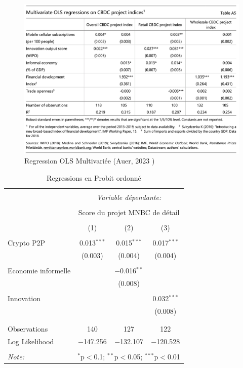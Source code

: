 \documentclass[12pt]{article}
\begin{document}
\begin{figure}
    \centering
    \includegraphics[width=1\linewidth]{TAB AUER OLS Multivariate.png}
    \caption{Regression OLS Multivariée (Auer, 2023 \cite{RePEc:bis:biswps:880})}
    \label{fig:Regression_OLS_Multivariée}
\end{figure}

\begin{table}[!htbp] \centering 
  \caption{Regressions en Probit ordonné} 
  \label{} 
\begin{tabular}{@{\extracolsep{5pt}}lccc} 
\\[-1.8ex]\hline 
\hline \\[-1.8ex] 
 & \multicolumn{3}{c}{\textit{Variable dépendante:}} \\ 
\cline{2-4} 
\\[-1.8ex] & \multicolumn{3}{c}{Score du projet MNBC de détail} \\ 
\\[-1.8ex] & (1) & (2) & (3)\\ 
\hline \\[-1.8ex] 
 Crypto P2P & 0.013$^{***}$ & 0.015$^{***}$ & 0.017$^{***}$ \\ 
  & (0.003) & (0.004) & (0.004) \\ 
  & & & \\ 
 Economie informelle &  & $-$0.016$^{**}$ &  \\ 
  &  & (0.008) &  \\ 
  & & & \\ 
 Innovation &  &  & 0.032$^{***}$ \\ 
  &  &  & (0.008) \\ 
  & & & \\ 
\hline \\[-1.8ex] 
Observations & 140 & 127 & 122 \\ 
Log Likelihood & $-$147.256 & $-$132.107 & $-$120.528 \\ 
\hline 
\hline \\[-1.8ex] 
\textit{Note:}  & \multicolumn{3}{r}{$^{*}$p$<$0.1; $^{**}$p$<$0.05; $^{***}$p$<$0.01} \\ 
\end{tabular} 
\end{table}

\clearpage

\printbibliography
\end{document}
